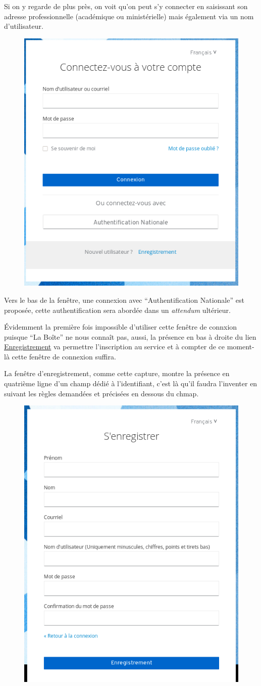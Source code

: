 Si on y regarde de plus près, on voit qu'on peut s'y connecter en saisissant son adresse professionnelle (académique ou ministérielle) mais également via un nom d'utilisateur. 
\begin{figure}
	\centering
	\includegraphics[width=0.500\linewidth]{./Captures/portail.site.web.connexion.zoom.png}
\end{figure}
Vers le bas de la fenêtre, une connexion avec ``Authentification Nationale'' est proposée, cette authentification sera abordée dans un \emph{attendum} ultérieur.

Évidemment la première fois impossible d'utiliser cette fenêtre de connxion puisque ``La Boîte'' ne nous connaît pas, aussi, la présence en bas à droite du lien \href{https://auth.apps.education.fr/auth/realms/apps/login-actions/registration?client_id=sso&tab_id=bVmOhc3T6kQ}{Enregistrement} va permettre l'inscription au service et à compter de ce moment-là cette fenêtre de connexion suffira.

La fenêtre d'enregistrement, comme cette capture, montre la présence en quatrième ligne d'un champ dédié à l'identifiant, c'est là qu'il faudra l'inventer en suivant les règles demandées et précisées en dessous du chmap.
\begin{figure}
	\centering
	\includegraphics[width=0.500\linewidth]{./Captures/portail.site.web.enregistrement.png}
	\caption{}
\end{figure}

